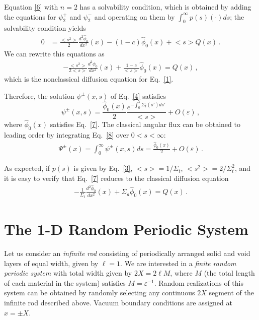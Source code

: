 \documentclass{anstrans}
\newcommand{\bl}{\big<}
\newcommand{\bg}{\big>}
\begin{document}
 Equation \eqref{6} with $n=2$ has a solvability condition, which is obtained by adding the equations for $\psi_2^+$ and $\psi_2^-$ and operating on them by $\int_0^{\infty} p(s) ( \cdot ) ds $; the solvability condition yields
   \begin{align}
      0 &= \frac{\bl s^2\bg}{2}\frac{d^2\hat\phi_0}{dx^2}(x) - (1-c)\hat\phi_0( x) + \bl s\bg Q( x)\,.\nonumber
   \end{align}
We can rewrite this equations as
\begin{align}
      -\frac{\bl s^2\bg}{2\bl s\bg}\frac{d^2\hat\phi_0}{dx^2}(x) + \frac{1-c}{\bl s\bg } \hat\phi_0(x) = Q(x)\,,\label{7}
      \end{align}
which is the nonclassical diffusion equation for Eq.\ \eqref{1}.

Therefore, the solution $\psi^\pm(x, s)$ of Eq.\ \eqref{4} satisfies
   \begin{equation}
      \psi^\pm(x, s) = \frac{\hat\phi_0(x)}{2} \frac{e^{- \int_0^s \Sigma_t( s') ds'}} {\bl s\bg} + O(\varepsilon) \,,\label{8}
   \end{equation} 
where $\hat\phi_0(x)$ satisfies Eq.\ \eqref{7}. The classical angular flux can be obtained to leading order by integrating Eq.\ \eqref{8} over $0 < s < \infty$:
   \begin{align}
   \Psi^\pm(x) = \int_0^{\infty}\psi^\pm(x,s)ds = \frac{\hat\phi_0(x)}{2}+ O(\varepsilon) \,.
   \nonumber
   \end{align}

As expected, if $p(s)$ is given by Eq.\ \eqref{3}, $\bl s\bg = 1/\Sigma_t$, $\bl s^2\bg = 2/\Sigma_t^2$, and it is easy to verify that Eq.\ \eqref{7} reduces to the classical diffusion equation
\begin{align}
 -\frac{1}{\Sigma_t}\frac{d^2\hat\phi_0}{dx^2}(x) + \Sigma_a \hat\phi_0(x) = Q(x)\,.\nonumber
\end{align}

\section{The 1-D Random Periodic System}
Let us consider an \textit{infinite rod} consisting of periodically arranged solid and void layers of equal width, given by $\ell=1$.
We are interested in a \textit{finite random periodic system} with total width given by $2X = 2\ell M$, where $M$ (the total length of each material in the system) satisfies $M = \varepsilon^{-1}$. Random realizations of this system can be obtained by randomly selecting any continuous $2X$ segment of the infinite rod described above. Vacuum boundary conditions are assigned at $x=\pm X$. 
\end{document}

